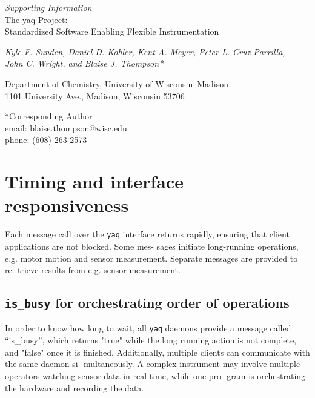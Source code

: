 \documentclass[11pt, full]{article}
\newcommand\yaq{\texttt{yaq}}
\renewcommand{\thefigure}{S\arabic{figure}}
\let\stdsection\section
\renewcommand\section{\clearpage\stdsection}
\begin{document}

\begin{center}
  \LARGE

  \textit{Supporting Information} \\
  The yaq Project: \\
  Standardized Software Enabling Flexible Instrumentation

  \normalsize

  \textit{Kyle F. Sunden, Daniel D. Kohler, Kent A. Meyer, Peter L. Cruz Parrilla, \\
    John C. Wright, and Blaise J. Thompson*}

  Department of Chemistry, University of Wisconsin--Madison\\
  1101 University Ave., Madison, Wisconsin 53706
\end{center}

\vspace{\fill}

*Corresponding Author \\
\hspace*{2ex} email: blaise.thompson@wisc.edu \\
\hspace*{2ex} phone: (608) 263-2573

\pagebreak
\setcounter{page}{1}
\renewcommand{\thepage}{S\arabic{page}} 
\renewcommand{\thefigure}{S\arabic{figure}} 

\pagebreak
\renewcommand{\baselinestretch}{0.75}\normalsize
\tableofcontents
\renewcommand{\baselinestretch}{1.0}\normalsize



\section{Timing and interface responsiveness}

Each message call over the \yaq{} interface returns rapidly,
ensuring that client applications are not blocked. Some mes-
sages initiate long-running operations, e.g. motor motion and
sensor measurement. Separate messages are provided to re-
trieve results from e.g. sensor measurement.

\subsection{\texttt{is\_busy} for orchestrating order of operations}

In order to know how long to wait, all \yaq{} daemons provide a message called
“is\_busy”, which returns "true" while the long running action
is not complete, and "false" once it is finished. Additionally,
multiple clients can communicate with the same daemon si-
multaneously. A complex instrument may involve multiple
operators watching sensor data in real time, while one pro-
gram is orchestrating the hardware and recording the data.
\end{document}
